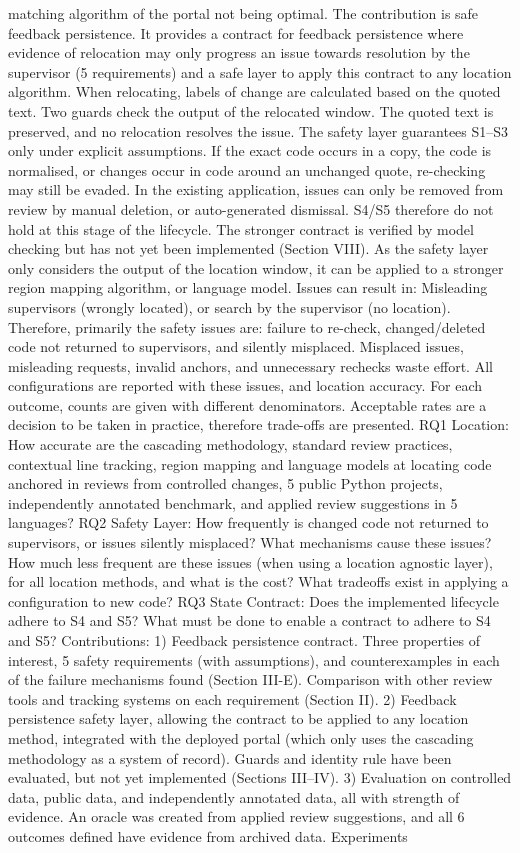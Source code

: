 \documentclass[10pt,conference,letterpaper]{IEEEtran}
\begin{document}
matching algorithm of the portal not being optimal. The contribution is safe feedback persistence. It provides a contract for feedback persistence where evidence of relocation may only progress an issue towards resolution by the supervisor (5 requirements) and a safe layer to apply this contract to any location algorithm. When relocating, labels of change are calculated based on the quoted text. Two guards check the output of the relocated window. The quoted text is preserved, and no relocation resolves the issue. The safety layer guarantees S1--S3 only under explicit assumptions. If the exact code occurs in a copy, the code is normalised, or changes occur in code around an unchanged quote, re-checking may still be evaded. In the existing application, issues can only be removed from review by manual deletion, or auto-generated dismissal. S4/S5 therefore do not hold at this stage of the lifecycle. The stronger contract is verified by model checking but has not yet been implemented (Section VIII). As the safety layer only considers the output of the location window, it can be applied to a stronger region mapping algorithm, or language model. Issues can result in: Misleading supervisors (wrongly located), or search by the supervisor (no location). Therefore, primarily the safety issues are: failure to re-check, changed/deleted code not returned to supervisors, and silently misplaced. Misplaced issues, misleading requests, invalid anchors, and unnecessary rechecks waste effort. All configurations are reported with these issues, and location accuracy. For each outcome, counts are given with different denominators. Acceptable rates are a decision to be taken in practice, therefore trade-offs are presented. RQ1 Location: How accurate are the cascading methodology, standard review practices, contextual line tracking, region mapping and language models at locating code anchored in reviews from controlled changes, 5 public Python projects, independently annotated benchmark, and applied review suggestions in 5 languages? RQ2 Safety Layer: How frequently is changed code not returned to supervisors, or issues silently misplaced? What mechanisms cause these issues? How much less frequent are these issues (when using a location agnostic layer), for all location methods, and what is the cost? What tradeoffs exist in applying a configuration to new code? RQ3 State Contract: Does the implemented lifecycle adhere to S4 and S5? What must be done to enable a contract to adhere to S4 and S5? Contributions: 1) Feedback persistence contract. Three properties of interest, 5 safety requirements (with assumptions), and counterexamples in each of the failure mechanisms found (Section III-E). Comparison with other review tools and tracking systems on each requirement (Section II). 2) Feedback persistence safety layer, allowing the contract to be applied to any location method, integrated with the deployed portal (which only uses the cascading methodology as a system of record). Guards and identity rule have been evaluated, but not yet implemented (Sections III--IV). 3) Evaluation on controlled data, public data, and independently annotated data, all with strength of evidence. An oracle was created from applied review suggestions, and all 6 outcomes defined have evidence from archived data. Experiments 
\end{document}
